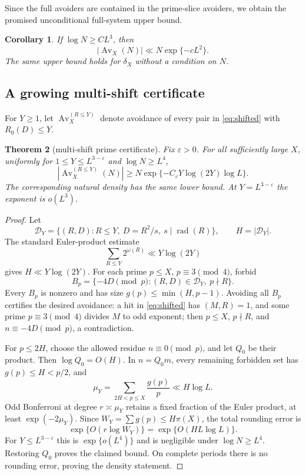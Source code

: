 \documentclass[10pt,reqno]{amsart}
\newtheorem{theorem}{Theorem}[section]
\newtheorem{corollary}[theorem]{Corollary}
\theoremstyle{definition}
\newcommand{\Av}{\operatorname {Av}}
\newcommand{\rad}{\operatorname {rad}}
\newcommand{\1}{\mathbf 1}
\newcommand{\eps}{\varepsilon}
\begin{document}
Since the full avoiders are contained in the prime-slice avoiders, we obtain the promised unconditional full-system upper bound.
\begin{corollary}\label{cor:full-upper}
If $\log N\geq CL^3$, then
\[
 |\Av_X(N)|\ll N\exp\{-cL^2\}.
\]
The same upper bound holds for $\delta_X$ without a condition on $N$.
\end{corollary}

\subsection{A growing multi-shift certificate}
For $Y\geq1$, let $\Av_X^{(R\leq Y)}$ denote avoidance of every pair in \eqref{eq:shifted} with $R_0(D)\leq Y$.
\begin{theorem}[multi-shift prime certificate]\label{thm:multi-shift}
Fix $\eps>0$.  For all sufficiently large $X$, uniformly for $1\leq Y\leq L^{3-\eps}$ and $\log N\geq L^4$,
\[
 |\Av_X^{(R\leq Y)}(N)|
 \geq N\exp\{-C_\eps Y\log(2Y)\log L\}.
\]
The corresponding natural density has the same lower bound.  At $Y=L^{3-\eps}$ the exponent is $o(L^3)$.
\end{theorem}
\begin{proof}
Let
\[
 \mathcal D_Y=\{(R,D):R\leq Y,\ D=R^2/s,\ s\mid\rad(R)\},
 \qquad H=|\mathcal D_Y|.
\]
The standard Euler-product estimate
\[
 \sum_{R\leq Y}2^{\omega(R)}\ll Y\log(2Y)
\]
gives $H\ll Y\log(2Y)$.  For each prime $p\leq X$, $p\equiv3\pmod4$, forbid
\[
 B_p=\{-4D\pmod p:(R,D)\in\mathcal D_Y,\ p\nmid R\}.
\]
Every $B_p$ is nonzero and has size $g(p)\leq\min(H,p-1)$.  Avoiding all $B_p$ certifies the desired avoidance: a hit in \eqref{eq:shifted} has $(M,R)=1$, and some prime $p\equiv3\pmod4$ divides $M$ to odd exponent; then $p\leq X$, $p\nmid R$, and $n\equiv-4D\pmod p$, a contradiction.

For $p\leq2H$, choose the allowed residue $n\equiv0\pmod p$, and let $Q_0$ be their product.  Then $\log Q_0=O(H)$.  In $n=Q_0m$, every remaining forbidden set has $g(p)\leq H<p/2$, and
\[
 \mu_Y=\sum_{2H<p\leq X}\frac{g(p)}p\ll H\log L.
\]
Odd Bonferroni at degree $r\asymp\mu_Y$ retains a fixed fraction of the Euler product, at least $\exp(-2\mu_Y)$.  Since $W_Y=\sum g(p)\leq H\pi(X)$, the total rounding error is
\[
 \exp\{O(r\log W_Y)\}=\exp\{O(HL\log L)\}.
\]
For $Y\leq L^{3-\eps}$ this is $\exp\{o(L^4)\}$ and is negligible under $\log N\geq L^4$.  Restoring $Q_0$ proves the claimed bound.  On complete periods there is no rounding error, proving the density statement.
\end{proof}
\end{document}
